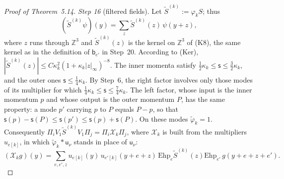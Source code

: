 \documentclass[11pt,letterpaper,reqno]{amsart}
\theoremstyle{definition}
\begin{document}
\begin{proof}[Proof of Theorem~5.14]
\emph{Step 16} (filtered fields).
Let $\tilde S^{(k)}:=\varphi_kS$; thus
\begin{equation*}
(\tilde S^{(k)}\psi)(y)=\sum_z\tilde S^{(k)}(z)\,\psi(y+z),
\end{equation*}
where $z$ runs through $\mathbb Z^3$ and $\tilde S^{(k)}(z)$ is the kernel on $\mathbb Z^3$ of (K8), the same kernel as in the definition of $\mathsf b_{e'}$ in Step~20.
According to (Ker), $|\tilde S^{(k)}(z)|\le C\kappa_k^2(1+\kappa_k|z|_\infty)^{-8}$.
The inner momenta satisfy $\frac12\kappa_k\le\mathsf s\le\frac32\kappa_k$, and the outer ones $\mathsf s\le\frac14\kappa_k$.
By Step~6, the right factor involves only those modes of its multiplier for which $\frac14\kappa_k\le\mathsf s\le\frac74\kappa_k$.
The left factor, whose input is the inner momentum $p$ and whose output is the outer momentum $P$, has the same property: a mode $p'$ carrying $p$ to $P$ equals $P-p$, so that $\mathsf s(p)-\mathsf s(P)\le\mathsf s(p')\le\mathsf s(p)+\mathsf s(P)$.
On these modes $\tilde\varphi_k=1$.
Consequently $\Pi_iV_1\tilde S^{(k)}V_1\Pi_j=\Pi_i\mathcal X_k\Pi_j$, where $\mathcal X_k$ is built from the multipliers $u_{e[k]}$, in which $\tilde\varphi_k*\mathsf u_\nu$ stands in place of $\mathsf u_\nu$:
\begin{equation*}
(\mathcal X_kg)(y)=\sum_{e,e',z}u_{e[k]}(y)\,u_{e'[k]}(y+e+z)\,\mathrm{Ehp}_e\tilde S^{(k)}(z)\mathrm{Ehp}_{e'}\,g(y+e+z+e').
\end{equation*}


\end{proof}
\end{document}
